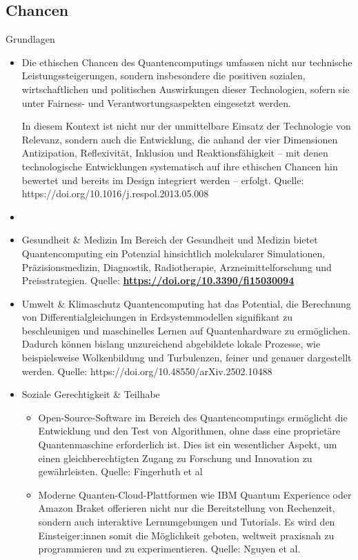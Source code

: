 \subsection{Chancen}

\item Grundlagen
\begin{itemize}
    \item Die ethischen Chancen des Quantencomputings umfassen nicht nur technische Leistungssteigerungen, sondern insbesondere die positiven sozialen, wirtschaftlichen und politischen Auswirkungen dieser Technologien, sofern sie unter Fairness- und Verantwortungsaspekten eingesetzt werden. \cite{arrow_holistic_2023}

In diesem Kontext ist nicht nur der unmittelbare Einsatz der Technologie von Relevanz, sondern auch die Entwicklung, die anhand der vier Dimensionen Antizipation, Reflexivität, Inklusion und Reaktionsfähigkeit – mit denen technologische Entwicklungen systematisch auf ihre ethischen Chancen hin bewertet und bereits im Design integriert werden – erfolgt. Quelle: https://doi.org/10.1016/j.respol.2013.05.008

\item \item Gesundheit \& Medizin
Im Bereich der Gesundheit und Medizin bietet Quantencomputing ein Potenzial hinsichtlich molekularer Simulationen, Präzisionsmedizin, Diagnostik, Radiotherapie, Arzneimittelforschung und Preisstrategien. Quelle: \href{https://doi.org/10.3390/fi15030094}{\textbf{https://doi.org/10.3390/fi15030094}}

\item Umwelt \& Klimaschutz
Quantencomputing hat das Potential, die Berechnung von Differentialgleichungen in Erdsystemmodellen signifikant zu beschleunigen und maschinelles Lernen auf Quantenhardware zu ermöglichen. Dadurch können bislang unzureichend abgebildete lokale Prozesse, wie beispielsweise Wolkenbildung und Turbulenzen, feiner und genauer dargestellt werden. Quelle: https://doi.org/10.48550/arXiv.2502.10488

\item Soziale Gerechtigkeit \& Teilhabe
\begin{itemize}
    \item Open-Source-Software im Bereich des Quantencomputings ermöglicht die Entwicklung und den Test von Algorithmen, ohne dass eine proprietäre Quantenmaschine erforderlich ist. Dies ist ein wesentlicher Aspekt, um einen gleichberechtigten Zugang zu Forschung und Innovation zu gewährleisten. Quelle: Fingerhuth et al
    \item Moderne Quanten-Cloud-Plattformen wie IBM Quantum Experience oder Amazon Braket offerieren nicht nur die Bereitstellung von Rechenzeit, sondern auch interaktive Lernumgebungen und Tutorials. Es wird den Einsteiger:innen somit die Möglichkeit geboten, weltweit praxisnah zu programmieren und zu experimentieren. Quelle: Nguyen et al.


\end{itemize}
\end{itemize}
